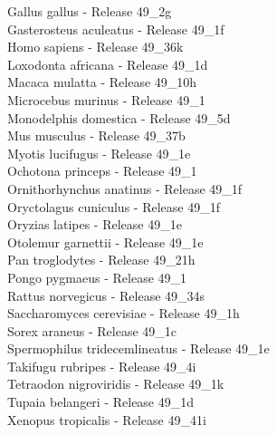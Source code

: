 \documentclass{article}
\begin{document}
\begin{Schunk}
 Gallus gallus - Release 49\_2g \\
 Gasterosteus aculeatus - Release 49\_1f \\
 Homo sapiens - Release 49\_36k \\
 Loxodonta africana - Release 49\_1d \\
 Macaca mulatta - Release 49\_10h \\
 Microcebus murinus - Release 49\_1 \\
 Monodelphis domestica - Release 49\_5d \\
 Mus musculus - Release 49\_37b \\
 Myotis lucifugus - Release 49\_1e \\
 Ochotona princeps - Release 49\_1 \\
 Ornithorhynchus anatinus - Release 49\_1f \\
 Oryctolagus cuniculus - Release 49\_1f \\
 Oryzias latipes - Release 49\_1e \\
 Otolemur garnettii - Release 49\_1e \\
 Pan troglodytes - Release 49\_21h \\
 Pongo pygmaeus - Release 49\_1 \\
 Rattus norvegicus - Release 49\_34s \\
 Saccharomyces cerevisiae - Release 49\_1h \\
 Sorex araneus - Release 49\_1c \\
 Spermophilus tridecemlineatus - Release 49\_1e \\
 Takifugu rubripes - Release 49\_4i \\
 Tetraodon nigroviridis - Release 49\_1k \\
 Tupaia belangeri - Release 49\_1d \\
 Xenopus tropicalis - Release 49\_41i \\



\end{Schunk}
\end{document}
